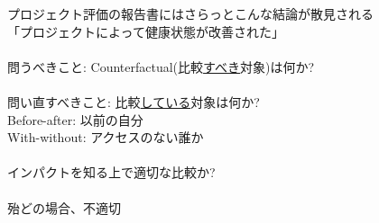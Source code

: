 \begin{frame}{}
\setlength{\baselineskip}{20pt}
プロジェクト評価の報告書にはさらっとこんな結論が散見される\\
「プロジェクトによって健康状態が改善された」\\~\\
\pause
問うべきこと: Counterfactual(比較\underline{すべき}対象)は何か?\\~\\

\pause
問い直すべきこと: 比較\underline{している}対象は何か?\\

\pause
Before-after: 以前の自分
\\

\pause
With-without: アクセスのない誰か
\\~\\

\pause
インパクトを知る上で適切な比較か?\\~\\

\pause
殆どの場合、不適切
\end{frame}

